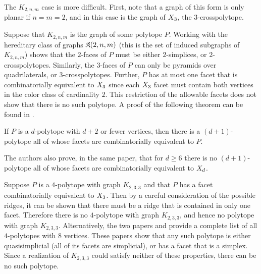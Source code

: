     The \(K_{2,n,m}\) case is more difficult.  First, note that a graph of this form is only planar if \(n=m=2\), and in this case is the graph of \(X_{3}\), the \(3\)-crosspolytope.

    Suppose that \(K_{2,n,m}\) is the graph of some polytope \(P\).  Working with the hereditary class of graphs \(\mathfrak{K}(2,n,m)\) (this is the set of induced subgraphs of \(K_{2,n,m}\)) shows that the \(2\)-faces of \(P\) must be either \(2\)-simplices, or \(2\)-crosspolytopes.  Similarly, the \(3\)-faces of \(P\) can only be pyramids over quadrilaterals, or \(3\)-crosspolytopes.  Further, \(P\) has at most one facet that is combinatorially equivalent to \(X_{3}\) since each \(X_{3}\) facet must contain both vertices in the color class of cardinality \(2\).  This restriction of the allowable facets does not show that there is no such polytope.  A proof of the following theorem can be found in \cite{PerShep}.
        \begin{Theorem}
            If \(P\) is a \(d\)-polytope with \(d+2\) or fewer vertices, then there is a \((d+1)\)-polytope all of whose facets are combinatorially equivalent to \(P\).
        \end{Theorem}
    The authors also prove, in the same paper, that for \(d\ge6\) there is no \((d+1)\)-polytope all of whose facets are combinatorially equivalent to \(X_{d}\).

    Suppose \(P\) is a \(4\)-polytope with graph \(K_{2,3,3}\) and that \(P\) has a facet combinatorially equivalent to \(X_{3}\).  Then by a careful consideration of the possible ridges, it can be shown that there must be a ridge that is contained in only one facet.  Therefore there is no \(4\)-polytope with graph \(K_{2,3,3}\), and hence no polytope with graph \(K_{2,3,3}\).  Alternatively, the two papers \cite{Alts:Quasi} and \cite{Alts:Complete} provide a complete list of all \(4\)-polytopes with \(8\) vertices.  These papers show that any such polytope is either quasisimplicial (all of its facets are simplicial), or has a facet that is a simplex.  Since a realization of \(K_{2,3,3}\) could satisfy neither of these properties, there can be no such polytope.

